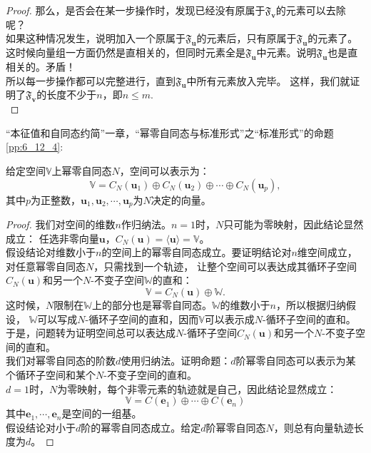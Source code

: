 \documentclass[12pt,UTF8,fontset=none]{ctexbook}
\begin{document}
\begin{appendix}
\begin{proof}
    那么，是否会在某一步操作时，发现已经没有原属于$\mathfrak{F}_{\mathbf{v}}$的元素可以去除呢？\\
    如果这种情况发生，说明加入一个原属于$\mathfrak{F}_{\mathbf{u}}$的元素后，只有原属于$\mathfrak{F}_{\mathbf{u}}$的元素了。
    这时候向量组一方面仍然是直相关的，但同时元素全是$\mathfrak{F}_{\mathbf{u}}$中元素。说明$\mathfrak{F}_{\mathbf{u}}$也是直相关的。矛盾！\\
    所以每一步操作都可以完整进行，直到$\mathfrak{F}_{\mathbf{u}}$中所有元素放入完毕。
    这样，我们就证明了$\mathfrak{F}_{\mathbf{v}}$的长度不少于$n$，即$n \leq m$.\\
\end{proof}

“本征值和自同态约简”一章，“幂零自同态与标准形式”之“标准形式”的命题\ref{pp:6_12_4}:
\begin{pp}\label{c-20}
    给定空间$\mathbb{V}$上幂零自同态$N$，空间可以表示为：
    $$ \mathbb{V} = C_N(\mathbf{u}_1) \oplus C_N(\mathbf{u}_2) \oplus \cdots \oplus C_N(\mathbf{u}_p),$$
    其中$p$为正整数，$\mathbf{u}_1, \mathbf{u}_2, \cdots , \mathbf{u}_p$为$N$决定的向量。
\end{pp}
\begin{proof} %
我们对空间的维数$n$作归纳法。$n=1$时，$N$只可能为零映射，因此结论显然成立：
任选非零向量$\mathbf{u}$，$C_N(\mathbf{u}) = \langle \mathbf{u} \rangle = \mathbb{V}$。\\
假设结论对维数小于$n$的空间上的幂零自同态成立。要证明结论对$n$维空间成立，对任意幂零自同态$N$，只需找到一个轨迹，
让整个空间可以表达成其循环子空间$C_N(\mathbf{u})$和另一个$N$-不变子空间$\mathbb{W}$的直和：
$$ \mathbb{V} = C_N(\mathbf{u}) \oplus \mathbb{W}.$$
这时候，$N$限制在$\mathbb{W}$上的部分也是幂零自同态。$\mathbb{W}$的维数小于$n$，所以根据归纳假设，
$\mathbb{W}$可以写成$N$-循环子空间的直和，因而$\mathbb{V}$可以表示成$N$-循环子空间的直和。\\
于是，问题转为证明空间总可以表达成$N$-循环子空间$C_N(\mathbf{u})$和另一个$N$-不变子空间的直和。\\
我们对幂零自同态的阶数$d$使用归纳法。证明命题：$d$阶幂零自同态可以表示为某个循环子空间和某个$N$-不变子空间的直和。\\
$d=1$时，$N$为零映射，每个非零元素的轨迹就是自己，因此结论显然成立：
$$\mathbb{V} = C(\mathbf{e}_1) \oplus \cdots \oplus C(\mathbf{e}_n)$$
其中$\mathbf{e}_1, \cdots , \mathbf{e}_n$是空间的一组基。\\
假设结论对小于$d$阶的幂零自同态成立。给定$d$阶幂零自同态$N$，则总有向量轨迹长度为$d$。

\end{proof}
\end{appendix}
\end{document}
